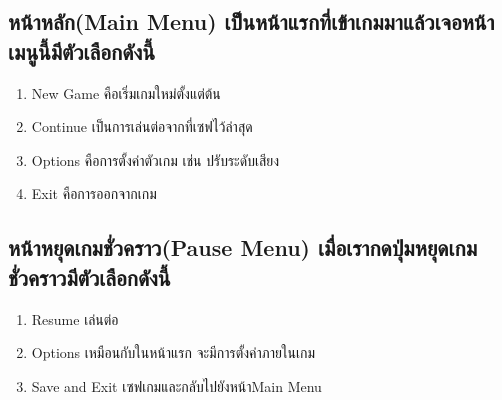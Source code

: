 

\subsection{หน้าหลัก(Main Menu) เป็นหน้าแรกที่เข้าเกมมาแล้วเจอหน้าเมนูนี้มีตัวเลือกดังนี้}
\begin{enumerate}
  \item New Game คือเริ่มเกมใหม่ตั้งแต่ต้น
  \item Continue เป็นการเล่นต่อจากที่เซฟไว้ล่าสุด
  \item Options คือการตั้งค่าตัวเกม เช่น ปรับระดับเสียง
  \item Exit คือการออกจากเกม
\end{enumerate}

\subsection{หน้าหยุดเกมชั่วคราว(Pause Menu) เมื่อเรากดปุ่มหยุดเกมชั่วคราวมีตัวเลือกดังนี้}
\begin{enumerate}
  \item Resume เล่นต่อ
  \item Options เหมือนกับในหน้าแรก จะมีการตั้งค่าภายในเกม
  \item Save and Exit เซฟเกมและกลับไปยังหน้าMain Menu
\end{enumerate}

